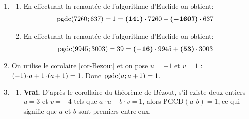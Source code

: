 \begin{enumerate}[label=\thechapter.\arabic*, font=\bfseries, itemsep=7mm,labelsep*=3mm,left=0mm]
\begin{enumerate}[label=\textbf{\alph*)}, leftmargin=*]
	Les éléments inversibles de $\mathbb{Z}_{20}$ sont donc $\{\cl[20]{1}, \cl[20]{3}, \cl[20]{7}, \cl[20]{9}, \cl[20]{11}, \cl[20]{13}, \cl[20]{17}, \cl[20]{19}\}$.
	
	Calcul de leurs inverses :
	\begin{itemize}
		\item $\cl[20]{1}^{-1} = \cl[20]{1}$
		\item $\cl[20]{3} \cdot \cl[20]{7} = \cl[20]{21} = \cl[20]{1} \implies \cl[20]{3}^{-1} = \cl[20]{7}$ et $\cl[20]{7}^{-1} = \cl[20]{3}$
		\item $\cl[20]{9} \cdot \cl[20]{9} = \cl[20]{81} = \cl[20]{1} \implies \cl[20]{9}^{-1} = \cl[20]{9}$
		\item $\cl[20]{11} \cdot \cl[20]{11} = \cl[20]{121} = \cl[20]{1} \implies \cl[20]{11}^{-1} = \cl[20]{11}$
		\item $\cl[20]{13} \cdot \cl[20]{17} = (-\cl[20]{7}) \cdot (-\cl[20]{3}) = \cl[20]{21} = \cl[20]{1} \implies \cl[20]{13}^{-1} = \cl[20]{17}$ et $\cl[20]{17}^{-1} = \cl[20]{13}$
		\item $\cl[20]{19}^{-1} = (-\cl[20]{1})^{-1} = -\cl[20]{1} = \cl[20]{19}$
	\end{itemize}
	
\end{enumerate}


\item
\begin{enumerate}[label=\alph*),itemsep=4mm]
\item
En effectuant la remontée de l'algorithme d'Euclide on obtient:
$$\textrm{pgdc}(7260;637)=1=\bm{(141)}\cdot 7260 + \bm{(-1607)}\cdot 637$$
\item
En effectuant la remontée de l'algorithme d'Euclide on obtient:
$$\textrm{pgdc}(9945;3003)=39=\bm{(-16)}\cdot 9945 + \bm{(53)}\cdot 3003$$
\end{enumerate}





\item
On utilise le corolaire \ref{cor-Bezout} et on pose $u=-1$ et $v=1$ : $(-1)\hspace*{-0.5mm}\cdot\hspace*{-0.5mm} a+1\hspace*{-0.5mm}\cdot\hspace*{-0.5mm}(a+1)=1$. Donc $\textrm{pgdc}(a;a+1)=1$.

\item
\begin{enumerate}[label=\textbf{\alph*)}, leftmargin=*]
	\item \textbf{Vrai.} D'après le corollaire du théorème de Bézout, s'il existe deux entiers $u = 3$ et $v = -4$ tels que $a \cdot u + b \cdot v = 1$, alors $\text{PGCD}(a;b) = 1$, ce qui signifie que $a$ et $b$ sont premiers entre eux.
	

\end{enumerate}
\end{enumerate}
